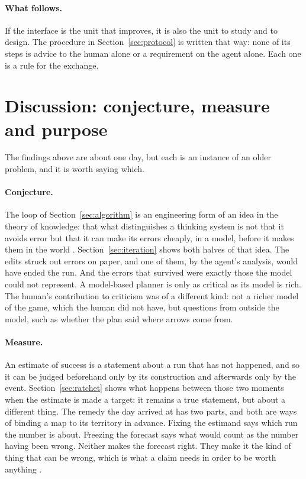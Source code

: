 \documentclass[11pt,a4paper]{article}
\begin{document}
\paragraph{What follows.} If the interface is the unit that improves, it is also the unit to study and to design. The procedure in Section~\ref{sec:protocol} is written that way: none of its steps is advice to the human alone or a requirement on the agent alone. Each one is a rule for the exchange.

\section{Discussion: conjecture, measure and purpose}
\label{sec:discussion}

The findings above are about one day, but each is an instance of an older problem, and it is worth saying which.

\paragraph{Conjecture.} The loop of Section~\ref{sec:algorithm} is an engineering form of an idea in the theory of knowledge: that what distinguishes a thinking system is not that it avoids error but that it can make its errors cheaply, in a model, before it makes them in the world \citep{popper1963,dennett1995}. Section~\ref{sec:iteration} shows both halves of that idea. The edits struck out errors on paper, and one of them, by the agent's analysis, would have ended the run. And the errors that survived were exactly those the model could not represent. A model-based planner is only as critical as its model is rich. The human's contribution to criticism was of a different kind: not a richer model of the game, which the human did not have, but questions from outside the model, such as whether the plan said where arrows come from.

\paragraph{Measure.} An estimate of success is a statement about a run that has not happened, and so it can be judged beforehand only by its construction and afterwards only by the event. Section~\ref{sec:ratchet} shows what happens between those two moments when the estimate is made a target: it remains a true statement, but about a different thing. The remedy the day arrived at has two parts, and both are ways of binding a map to its territory in advance. Fixing the estimand says which run the number is about. Freezing the forecast says what would count as the number having been wrong. Neither makes the forecast right. They make it the kind of thing that can be wrong, which is what a claim needs in order to be worth anything \citep{popper1963}.
\end{document}
